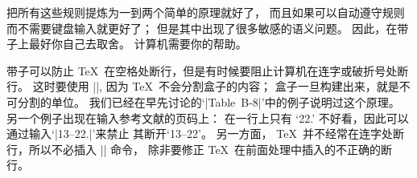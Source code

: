 \noindent 把所有这些规则提炼为一到两个简单的原理就好了，
而且如果可以自动遵守规则而不需要键盘输入就更好了；
但是其中出现了很多敏感的语义问题。%
\1因此，在带子上最好你自己去取舍。%
计算机需要你的帮助。

带子可以防止 \TeX\ 在空格处断行，但是有时候要阻止计算机在连字或破折号处断行。
这时要使用 |\hbox|, 因为 \TeX\ 不会分割盒子的内容；
盒子一旦构建出来，就是不可分割的单位。%
我们已经在早先讨论的`|Table~\hbox{B-8}|'中的例子说明过这个原理。%
另一个例子出现在输入参考文献的页码上：
在一行上只有 \hbox{`22.'} 不好看，因此可以通过输入`|\hbox{13--22}.|'来禁止%
其断开`\hbox{13--22}'。%
另一方面， \TeX\ 并不经常在连字处断行，所以不必插入 |\hbox| 命令，
除非要修正 \TeX\ 在前面处理中插入的不正确的断行。

